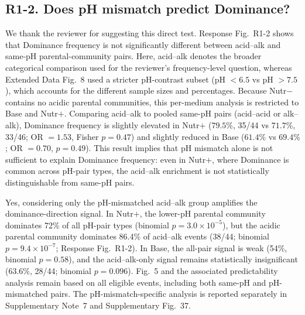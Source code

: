 \subsection*{R1-2. Does pH mismatch predict Dominance?}


\responselabel
We thank the reviewer for suggesting this direct test. Response Fig.~R1-2 shows that Dominance frequency is not significantly different between acid--alk and same-pH parental-community pairs. Here, acid--alk denotes the broader categorical comparison used for the reviewer's frequency-level question, whereas Extended Data Fig.~8 used a stricter pH-contrast subset (pH $< 6.5$ vs pH $> 7.5$), which accounts for the different sample sizes and percentages. Because Nutr$-$ contains no acidic parental communities, this per-medium analysis is restricted to Base and Nutr$+$. Comparing acid--alk to pooled same-pH pairs (acid--acid or alk--alk), Dominance frequency is slightly elevated in Nutr$+$ ($79.5\%$, 35/44 vs $71.7\%$, 33/46; OR $= 1.53$, Fisher $p = 0.47$) and slightly reduced in Base ($61.4\%$ vs $69.4\%$; OR $= 0.70$, $p = 0.49$). This result implies that pH mismatch alone is not sufficient to explain Dominance frequency: even in Nutr$+$, where Dominance is common across pH-pair types, the acid--alk enrichment is not statistically distinguishable from same-pH pairs.


Yes, considering only the pH-mismatched acid--alk group amplifies the dominance-direction signal. In Nutr$+$, the lower-pH parental community dominates 72\% of all pH-pair types (binomial $p = 3.0 \times 10^{-5}$), but the acidic parental community dominates 86.4\% of acid--alk events (38/44; binomial $p = 9.4 \times 10^{-7}$; Response Fig.~R1-2). In Base, the all-pair signal is weak (54\%, binomial $p = 0.58$), and the acid--alk-only signal remains statistically insignificant (63.6\%, 28/44; binomial $p = 0.096$). Fig.~5 and the associated predictability analysis remain based on all eligible events, including both same-pH and pH-mismatched pairs. The pH-mismatch-specific analysis is reported separately in Supplementary Note~7 and Supplementary Fig.~37.

